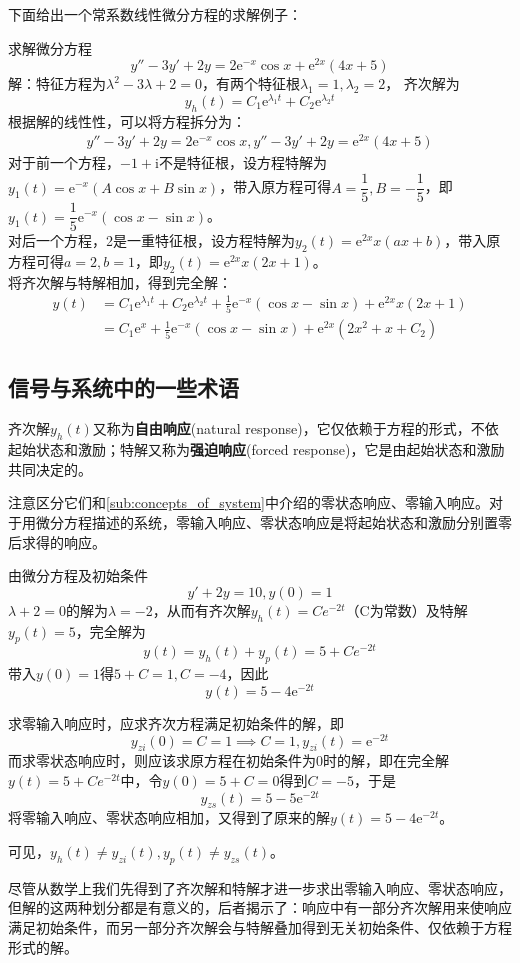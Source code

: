 下面给出一个常系数线性微分方程的求解例子：
\begin{example}
    求解微分方程\[y''-3y'+2y=2\mathrm{e}^{-x}\cos x+\mathrm{e}^{2x}(4x+5)\]
解：特征方程为$\lambda^2-3\lambda+2=0$，有两个特征根$\lambda_1=1,\lambda_2=2$，
齐次解为$$y_h(t)=C_1\mathrm{e}^{\lambda_1 t}+C_2\mathrm{e}^{\lambda_2 t}$$
根据解的线性性，可以将方程拆分为：\begin{align*}
    y''-3y'+2y=2\mathrm{e}^{-x}\cos x,y''-3y'+2y=\mathrm{e}^{2x}(4x+5)
\end{align*}
对于前一个方程，$-1+\mathrm{i}$不是特征根，设方程特解为$y_1(t)=\mathrm{e}^{-x}(A\cos x+B\sin x)$，带入原方程可得$A=\dfrac{1}{5},B=-\dfrac{1}{5}$，即$y_1(t)=\dfrac{1}{5}\mathrm{e}^{-x}(\cos x-\sin x)$。\\
对后一个方程，2是一重特征根，设方程特解为$y_2(t)=\mathrm{e}^{2x}x(ax+b)$，带入原方程可得$a=2,b=1$，即$y_2(t)=\mathrm{e}^{2x}x(2x+1)$。\\
将齐次解与特解相加，得到完全解：\begin{align*}
    y(t)&=C_1\mathrm{e}^{\lambda_1 t}+C_2\mathrm{e}^{\lambda_2 t}+\frac{1}{5}\mathrm{e}^{-x}(\cos x-\sin x)+\mathrm{e}^{2x}x(2x+1)\\
    &=C_1 \mathrm{e}^{x}+\frac{1}{5}\mathrm{e}^{-x}(\cos x-\sin x)+\mathrm{e}^{2x}(2x^2+x+C_2)
\end{align*}
\end{example}

\subsection{信号与系统中的一些术语}\label{sub:term_in_ODE}

\begin{definition}[自由响应与强迫相应]
    齐次解$y_h(t)$又称为\textbf{自由响应}(natural response)，它仅依赖于方程的形式，不依起始状态和激励；特解又称为\textbf{强迫响应}(forced response)，它是由起始状态和激励共同决定的。
\end{definition}
注意区分它们和\ref{sub:concepts_of_system}中介绍的零状态响应、零输入响应。对于用微分方程描述的系统，零输入响应、零状态响应是将起始状态和激励分别置零后求得的响应。

\begin{example}[两种响应划分方式的区别]
    由微分方程及初始条件
    \[y'+2y=10,y(0)=1\]
    $\lambda+2=0$的解为$\lambda=-2$，从而有齐次解$y_h(t)=Ce^{-2t}$（C为常数）及特解$y_p(t)=5$，完全解为
    $$y(t)=y_h(t)+y_p(t)=5+Ce^{-2t}$$
    带入$y(0)=1$得$5+C=1,C=-4$，因此
    \[y(t)=5-4\mathrm{e}^{-2t}\]

    求零输入响应时，应求齐次方程满足初始条件的解，即
    $$y_{zi}(0)=C=1\implies C=1,y_{zi}(t)=\mathrm{e}^{-2t}$$
    而求零状态响应时，则应该求原方程在初始条件为0时的解，即在完全解$y(t)=5+Ce^{-2t}$中，令$y(0)=5+C=0$得到$C=-5$，于是
    $$y_{zs}(t)=5-5\mathrm{e}^{-2t}$$
    将零输入响应、零状态响应相加，又得到了原来的解$y(t)=5-4\mathrm{e}^{-2t}$。

    可见，$y_h(t)\neq y_{zi}(t),y_p(t)\neq y_{zs}(t)$。
\end{example}
尽管从数学上我们先得到了齐次解和特解才进一步求出零输入响应、零状态响应，但解的这两种划分都是有意义的，后者揭示了：响应中有一部分齐次解用来使响应满足初始条件，而另一部分齐次解会与特解叠加得到无关初始条件、仅依赖于方程形式的解。

